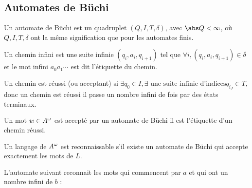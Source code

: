 \subsection{Automates de Büchi}

\begin{definition}
	Un automate de Büchi est un quadruplet $(Q,I,T,\delta)$, avec $\abs Q < \infty$, où
	$Q,I,T,\delta$ ont la même signification que pour les automates finis.
\end{definition}

\begin{definition}
	Un chemin infini est une suite infinie $(q_i,a_i,q_{i+1})$ tel que $\forall i, (q_i,a_i,q_{i+1}) \in \delta$ et le mot
	infini $a_0a_1\cdots$ est dit l'étiquette du chemin.
\end{definition}


\begin{definition}
	Un chemin est réussi (ou acceptant) si $\exists q_0 \in I, \exists \text{ une suite infinie d'indices} q_{i_J} \in T$,
	donc un chemin est réussi \ssi il passe un nombre infini de fois par des états terminaux.
\end{definition}

\begin{definition}
	Un mot $w \in A^{\omega}$ est accepté par un automate de Büchi \ssi il est l'étiquette d'un chemin réussi.
\end{definition}


\begin{definition}
	Un langage de $A^{\omega}$ est reconnaissable s'il existe un automate de Büchi qui accepte exactement les mots de $L$.
\end{definition}


\begin{exemple}
	L'automate suivant reconnait les mots qui commencent par $a$ et qui ont un nombre infini de $b$ :

\end{exemple}


